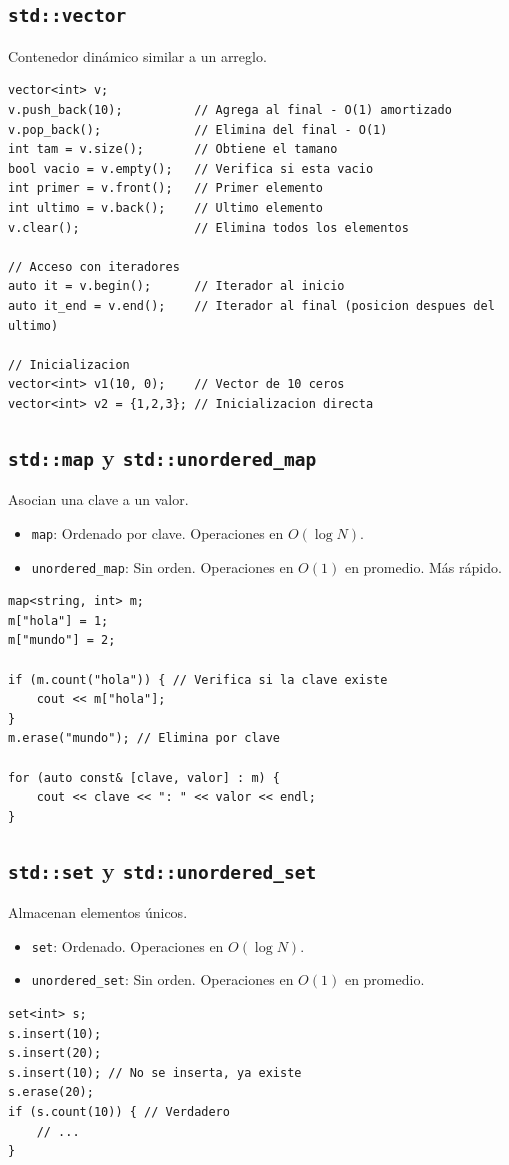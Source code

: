 \documentclass[11pt, a4paper]{article}
\begin{document}
\subsection{\texttt{std::vector}}
Contenedor dinámico similar a un arreglo.
\begin{lstlisting}
vector<int> v;
v.push_back(10);          // Agrega al final - O(1) amortizado
v.pop_back();             // Elimina del final - O(1)
int tam = v.size();       // Obtiene el tamano
bool vacio = v.empty();   // Verifica si esta vacio
int primer = v.front();   // Primer elemento
int ultimo = v.back();    // Ultimo elemento
v.clear();                // Elimina todos los elementos

// Acceso con iteradores
auto it = v.begin();      // Iterador al inicio
auto it_end = v.end();    // Iterador al final (posicion despues del ultimo)

// Inicializacion
vector<int> v1(10, 0);    // Vector de 10 ceros
vector<int> v2 = {1,2,3}; // Inicializacion directa
\end{lstlisting}

\subsection{\texttt{std::map} y \texttt{std::unordered\_map}}
Asocian una clave a un valor.
\begin{itemize}
	\item \texttt{map}: Ordenado por clave. Operaciones en $O(\log N)$.
	\item \texttt{unordered\_map}: Sin orden. Operaciones en $O(1)$ en promedio. Más rápido.
\end{itemize}
\begin{lstlisting}
map<string, int> m;
m["hola"] = 1;
m["mundo"] = 2;

if (m.count("hola")) { // Verifica si la clave existe
    cout << m["hola"];
}
m.erase("mundo"); // Elimina por clave

for (auto const& [clave, valor] : m) {
    cout << clave << ": " << valor << endl;
}
\end{lstlisting}

\subsection{\texttt{std::set} y \texttt{std::unordered\_set}}
Almacenan elementos únicos.
\begin{itemize}
	\item \texttt{set}: Ordenado. Operaciones en $O(\log N)$.
	\item \texttt{unordered\_set}: Sin orden. Operaciones en $O(1)$ en promedio.
\end{itemize}
\begin{lstlisting}
set<int> s;
s.insert(10);
s.insert(20);
s.insert(10); // No se inserta, ya existe
s.erase(20);
if (s.count(10)) { // Verdadero
    // ...
}
\end{lstlisting}
\end{document}
